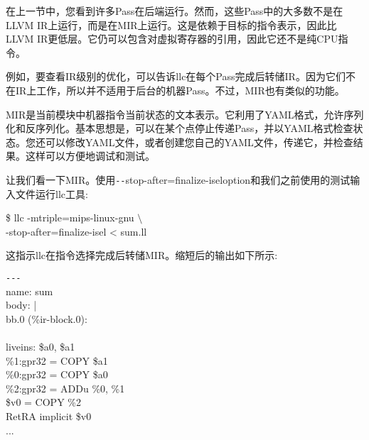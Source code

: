 在上一节中，您看到许多Pass在后端运行。然而，这些Pass中的大多数不是在LLVM IR上运行，而是在MIR上运行。这是依赖于目标的指令表示，因此比LLVM IR更低层。它仍可以包含对虚拟寄存器的引用，因此它还不是纯CPU指令。\par

例如，要查看IR级别的优化，可以告诉llc在每个Pass完成后转储IR。因为它们不在IR上工作，所以并不适用于后台的机器Pass。不过，MIR也有类似的功能。\par

MIR是当前模块中机器指令当前状态的文本表示。它利用了YAML格式，允许序列化和反序列化。基本思想是，可以在某个点停止传递Pass，并以YAML格式检查状态。您还可以修改YAML文件，或者创建您自己的YAML文件，传递它，并检查结果。这样可以方便地调试和测试。\par

让我们看一下MIR。使用\verb|--|stop-after=finalize-iseloption和我们之前使用的测试输入文件运行llc工具:\par

\begin{tcolorbox}[colback=white,colframe=black]
\$ llc -mtriple=mips-linux-gnu $\setminus$ \\
\hspace*{2cm}-stop-after=finalize-isel < sum.ll
\end{tcolorbox}

这指示llc在指令选择完成后转储MIR。缩短后的输出如下所示:\par

\begin{tcolorbox}[colback=white,colframe=black]
\verb|---| \\
name: \hspace{3cm}sum \\
body: \hspace{3cm}| \\
\hspace*{0.5cm}bb.0 (\%ir-block.0): \\
\\
\hspace*{0.5cm}liveins: \$a0, \$a1 \\
\hspace*{0.5cm}\%1:gpr32 = COPY \$a1 \\
\hspace*{0.5cm}\%0:gpr32 = COPY \$a0 \\
\hspace*{0.5cm}\%2:gpr32 = ADDu \%0, \%1 \\
\hspace*{0.5cm}\$v0 = COPY \%2 \\
\hspace*{0.5cm}RetRA implicit \$v0 \\
... 

\end{tcolorbox}

